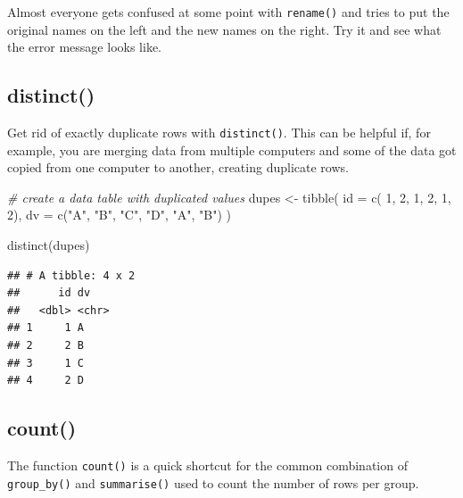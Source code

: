 \documentclass[
  oneside]{book}
\newenvironment{Shaded}{\begin{snugshade}}{\end{snugshade}}
\newcommand{\AttributeTok}[1]{\textcolor[rgb]{0.77,0.63,0.00}{#1}}
\newcommand{\CommentTok}[1]{\textcolor[rgb]{0.56,0.35,0.01}{\textit{#1}}}
\newcommand{\DecValTok}[1]{\textcolor[rgb]{0.00,0.00,0.81}{#1}}
\newcommand{\FunctionTok}[1]{\textcolor[rgb]{0.00,0.00,0.00}{#1}}
\newcommand{\NormalTok}[1]{#1}
\newcommand{\OtherTok}[1]{\textcolor[rgb]{0.56,0.35,0.01}{#1}}
\newcommand{\StringTok}[1]{\textcolor[rgb]{0.31,0.60,0.02}{#1}}
\begin{document}
\begin{try}
Almost everyone gets confused at some point with \texttt{rename()} and tries to put the original names on the left and the new names on the right. Try it and see what the error message looks like.

\end{try}

\hypertarget{distinct}{%
\subsection{distinct()}\label{distinct}}

Get rid of exactly duplicate rows with \texttt{distinct()}. This can be helpful if, for example, you are merging data from multiple computers and some of the data got copied from one computer to another, creating duplicate rows.

\begin{Shaded}
\begin{Highlighting}[]
\CommentTok{\# create a data table with duplicated values}
\NormalTok{dupes }\OtherTok{\textless{}{-}} \FunctionTok{tibble}\NormalTok{(}
  \AttributeTok{id =} \FunctionTok{c}\NormalTok{( }\DecValTok{1}\NormalTok{,   }\DecValTok{2}\NormalTok{,   }\DecValTok{1}\NormalTok{,   }\DecValTok{2}\NormalTok{,   }\DecValTok{1}\NormalTok{,   }\DecValTok{2}\NormalTok{),}
  \AttributeTok{dv =} \FunctionTok{c}\NormalTok{(}\StringTok{"A"}\NormalTok{, }\StringTok{"B"}\NormalTok{, }\StringTok{"C"}\NormalTok{, }\StringTok{"D"}\NormalTok{, }\StringTok{"A"}\NormalTok{, }\StringTok{"B"}\NormalTok{)}
\NormalTok{)}

\FunctionTok{distinct}\NormalTok{(dupes)}
\end{Highlighting}
\end{Shaded}

\begin{verbatim}
## # A tibble: 4 x 2
##      id dv   
##   <dbl> <chr>
## 1     1 A    
## 2     2 B    
## 3     1 C    
## 4     2 D
\end{verbatim}

\hypertarget{count}{%
\subsection{count()}\label{count}}

The function \texttt{count()} is a quick shortcut for the common combination of \texttt{group\_by()} and \texttt{summarise()} used to count the number of rows per group.
\end{document}
